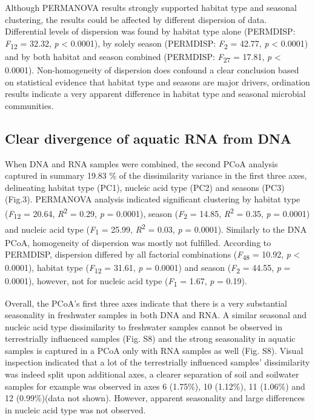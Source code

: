 \documentclass[12pt,a4paper]{article} %
\begin{document}
Although PERMANOVA results strongly supported habitat type and seasonal clustering, the results could be affected by different dispersion of data. Differential levels of dispersion was found by habitat type alone (PERMDISP: \textit{F}\textsubscript{12} = 32.32, \textit{p} < 0.0001), by solely season (PERMDISP: \textit{F}\textsubscript{2} = 42.77, \textit{p} < 0.0001) and by both habitat and season combined (PERMDISP: \textit{F}\textsubscript{27} = 17.81, \textit{p} < 0.0001). Non-homogeneity of dispersion does confound a clear conclusion based on statistical evidence that habitat type and seasons are major drivers, ordination results indicate a very apparent difference in habitat type and seasonal microbial communities.

\subsection*{Clear divergence of aquatic RNA from DNA}
When DNA and RNA samples were combined, the second PCoA analysis captured in summary 19.83 \% of the dissimilarity variance in the first three axes, delineating habitat type (PC1), nucleic acid type (PC2) and seasons (PC3)(Fig.3). PERMANOVA analysis indicated significant clustering by habitat type (\textit{F}\textsubscript{12} = 20.64, \textit{R}\textsuperscript{2} = 0.29, \textit{p} = 0.0001), season (\textit{F}\textsubscript{2} = 14.85, \textit{R}\textsuperscript{2} = 0.35, \textit{p} = 0.0001) and nucleic acid type (\textit{F}\textsubscript{1} = 25.99, \textit{R}\textsuperscript{2} = 0.03, \textit{p} = 0.0001). Similarly to the DNA PCoA, homogeneity of dispersion was mostly not fulfilled. According to PERMDISP, dispersion differed by all factorial combinations (\textit{F}\textsubscript{48} = 10.92, \textit{p} < 0.0001), habitat type (\textit{F}\textsubscript{12} = 31.61, \textit{p} = 0.0001) and season (\textit{F}\textsubscript{2} = 44.55, \textit{p} = 0.0001), however, not for nucleic acid type (\textit{F}\textsubscript{1} = 1.67, \textit{p} = 0.19).

Overall, the PCoA's first three axes indicate that there is a very substantial seasonality in freshwater samples in both DNA and RNA. A similar seasonal and nucleic acid type dissimilarity to freshwater samples cannot be observed in terrestrially influenced samples (Fig. S8) and the strong seasonality in aquatic samples is captured in a PCoA only with RNA samples as well (Fig. S8). Visual inspection indicated that a lot of the terrestrially influenced samples' dissimilarity was indeed split upon additional axes, a clearer separation of soil and soilwater samples for example was observed in axes 6 (1.75\%), 10 (1.12\%), 11 (1.06\%) and 12 (0.99\%)(data not shown). However, apparent seasonality and large differences in nucleic acid type was not observed.
\end{document}
